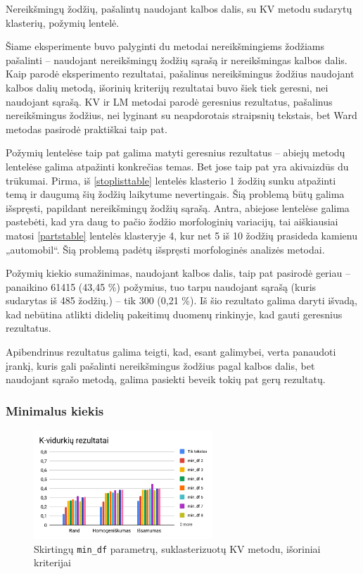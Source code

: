 \documentclass{VUMIFInfBakalaurinis}
\begin{document}
Nereikšmingų žodžių, pašalintų naudojant kalbos dalis, su KV metodu
sudarytų klasterių, požymių lentelė.

Šiame eksperimente buvo palyginti du metodai nereikšmingiems žodžiams
pašalinti -- naudojant nereikšmingų žodžių sąrašą ir nereikšmingas
kalbos dalis. Kaip parodė eksperimento rezultatai, pašalinus
nereikšmingus žodžius naudojant kalbos dalių metodą, išorinių kriterijų
rezultatai buvo šiek tiek geresni, nei naudojant sąrašą. KV ir LM
metodai parodė geresnius rezultatus, pašalinus nereikšmingus žodžius,
nei lyginant su neapdorotais straipsnių tekstais, bet Ward metodas
pasirodė praktiškai taip pat.

Požymių lentelėse taip pat galima matyti geresnius rezultatus -- abiejų
metodų lentelėse galima atpažinti konkrečias temas. Bet jose taip pat
yra akivaizdūs du trūkumai. Pirma, iš \ref{stoplisttable} lentelės klasterio 1 žodžių sunku atpažinti temą ir
daugumą šių žodžių laikytume nevertingais. Šią problemą būtų galima
išspręsti, papildant nereikšmingų žodžių sąrašą. Antra, abiejose
lentelėse galima pastebėti, kad yra daug to pačio žodžio morfologinių
variacijų, tai aiškiausiai matosi \ref{partstable}
lentelės klasteryje 4, kur net 5 iš 10 žodžių prasideda kamienu
„automobil“. Šią problemą padėtų išspręsti morfologinės analizės
metodai.

Požymių kiekio sumažinimas, naudojant kalbos dalis, taip pat pasirodė
geriau -- panaikino 61415 (43,45 \%) požymius, tuo tarpu naudojant
sąrašą (kuris sudarytas iš 485 žodžių.) -- tik 300 (0,21 \%). Iš šio
rezultato galima daryti išvadą, kad nebūtina atlikti didelių pakeitimų
duomenų rinkinyje, kad gauti geresnius rezultatus.

Apibendrinus rezultatus galima teigti, kad, esant galimybei, verta
panaudoti įrankį, kuris gali pašalinti nereikšmingus žodžius pagal
kalbos dalis, bet naudojant sąrašo metodą, galima pasiekti beveik tokių
pat gerų rezultatų.

\subsubsection{Minimalus kiekis}\label{mindftest}

\begin{figure}[H]
	\centering
	\includegraphics[width=0.6\textwidth]{./img/image11.png}
  \caption{Skirtingų \texttt{min\_df} parametrų, suklasterizuotų KV metodu, išoriniai
  kriterijai}
\end{figure}
\end{document}
